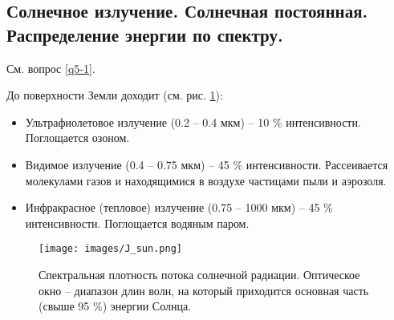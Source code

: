 \subsection{Солнечное излучение. Солнечная постоянная. Распределение энергии по спектру.}
См. вопрос \ref{q5-1}.

До поверхности Земли доходит (см. рис. \ref{fig:J_sun}):
\begin{itemize}
\item Ультрафиолетовое излучение (0.2 -- 0.4 мкм) -- 10 \% интенсивности. Поглощается озоном.
\item Видимое излучение (0.4 -- 0.75 мкм) -- 45 \% интенсивности. Рассеивается молекулами газов и находящимися в воздухе частицами пыли и аэрозоля.
\item Инфракрасное (тепловое) излучение (0.75 -- 1000 мкм) -- 45 \% интенсивности. Поглощается водяным паром.
\end{itemize}

\begin{figure}[!ht]
\centering
\texttt{[image: images/J\_sun.png]}
\caption{Спектральная плотность потока солнечной радиации. Оптическое окно -- диапазон длин волн, на который приходится основная часть (свыше 95 \%) энергии Солнца.}\label{fig:J_sun}
\end{figure}

